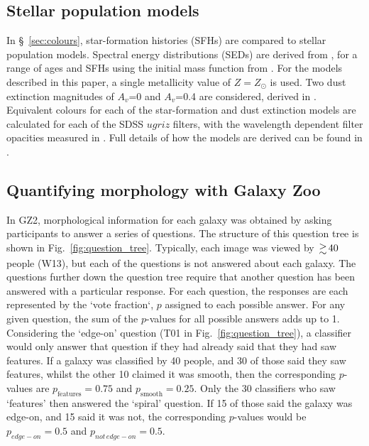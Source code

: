 \documentclass[useAMS,usenatbib]{mn2e}
\begin{document}
\subsection{Stellar population models}
\label{sec:SEDs}

In \S~\ref{sec:colours}, star-formation histories (SFHs) are compared to stellar population models. Spectral energy distributions (SEDs) are derived from \citealt{BC_03}, for a range of ages and SFHs using the initial mass function from \citealt{Chabrier_03}. For the models described in this paper, a single metallicity value of $Z=Z_{\odot}$ is used. Two dust extinction magnitudes of $A_v$=0 and $A_v$=0.4 are considered, derived in \citealt{Calzetti_00}. Equivalent colours for each of the star-formation and dust extinction models are calculated for each of the SDSS $ugriz$ filters, with the wavelength dependent filter opacities measured in \citealt{Doi_10}. Full details of how the models are derived can be found in \citealt{Duncan_14}.
\subsection{Quantifying morphology with Galaxy Zoo}
\label{sec:gz_morphologies}

In GZ2, morphological information for each galaxy was obtained by asking participants to answer a series of questions. The structure of this question tree is shown in Fig.~\ref{fig:question_tree}. Typically, each image was viewed by $\ga 40$ people (W13), but each of the questions is not answered about each galaxy. The questions further down the question tree require that another question has been answered with a particular response. For each question, the responses are each represented by the `vote fraction`, $p$ assigned to each possible answer. For any given question, the sum of the $p$-values for all possible answers adds up to 1. Considering the `edge-on' question (T01 in Fig.~\ref{fig:question_tree}), a classifier would only answer that question if they had already said that they had saw features. If a galaxy was classified by 40 people, and 30 of those said they saw features, whilst the other 10 claimed it was smooth, then the corresponding $p$-values are $p_{\mathrm{features}}=0.75$ and $p_\mathrm{{smooth}}=0.25$. Only the 30 classifiers who saw `features' then answered the `spiral' question. If 15 of those said the galaxy was edge-on, and 15 said it was not, the corresponding $p$-values would be $p_{edge-on}=0.5$ and $p_{not \, edge-on}=0.5$. 
\end{document}
